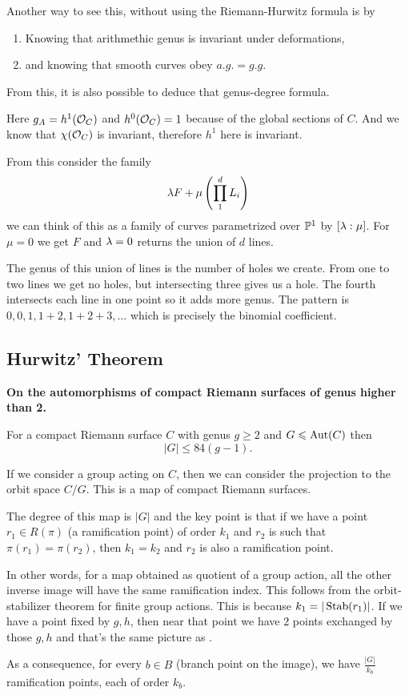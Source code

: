 \documentclass[12pt]{memoir}
\begin{document}
Another way to see this, without using the Riemann-Hurwitz formula is by
\begin{enumerate}
    \item Knowing that arithmethic genus is invariant under deformations,
    \item and knowing that smooth curves obey $a.g.=g.g.$
\end{enumerate}
From this, it is also possible to deduce that genus-degree formula.

\begin{Rmk}
    Here $g_A=h^1(\mathcal{O}_C)$ and $h^0(\mathcal{O}_C)=1$ because of the global sections of $C$. And we know that $\chi(\mathcal{O}_C)$ is invariant, therefore $h^1$ here is invariant.\par
    From this consider the family
    $$\lambda F+\mu\left(\prod_1^dL_i\right)$$
    we can think of this as a family of curves parametrized over $\mathbb{P}^1$ by $[\lambda:\mu]$. For $\mu=0$ we get $F$ and $\lambda=0$ returns the union of $d$ lines.\par
    The genus of this union of lines is the number of holes we create. From one to two lines we get no holes, but intersecting three gives us a hole. The fourth intersects each line in one point so it adds more genus. The pattern is $0,0,1,1+2,1+2+3,\dots$ which is precisely the binomial coefficient.
\end{Rmk}

\subsection{Hurwitz' Theorem}

\textbf{On the automorphisms of compact Riemann surfaces of genus higher than 2.}\par

\begin{Th}
    For a compact Riemann surface $C$ with genus $g\geq 2$ and $G\leqslant \operatorname{Aut}(C)$ then 
    $$|G|\leq 84(g-1).$$
\end{Th}

If we consider a group acting on $C$, then we can consider the projection to the orbit space $C/G$. This is a map of compact Riemann surfaces.\par
The degree of this map is $|G|$ and the key point is that if we have a point $r_1\in R(\pi)$ (a ramification point) of order $k_1$ and $r_2$ is such that $\pi(r_1)=\pi(r_2)$, then $k_1=k_2$ and $r_2$ is also a ramification point.\par
In other words, for a map obtained as quotient of a group action, all the other inverse image will have the same ramification index. This follows from the orbit-stabilizer theorem for finite group actions. This is because $k_1=|\operatorname{Stab}(r_1)|$. If we have a point fixed by $g,h$, then near that point we have $2$ points exchanged by those $g,h$ and that's the same picture as .\par
As a consequence, for every $b\in B$ (branch point on the image), we have $\frac{|G|}{k_b}$ ramification points, each of order $k_b$.
\end{document}

